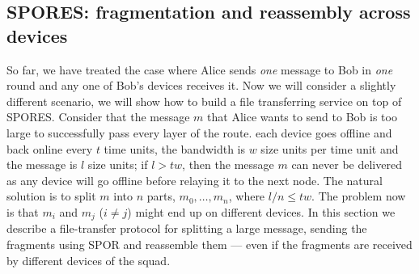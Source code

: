 \subsection{\acs{SPORES}: fragmentation and reassembly across devices}%
\label{SPORES}%
\label{sec:file_transfer}

So far, we have treated the case where Alice sends \emph{one} message to Bob in 
\emph{one} round and any one of Bob's devices receives it.
Now we will consider a slightly different scenario, we will show how to build a 
file transferring service on top of \ac{SPORES}.
Consider that the message \(m\) that Alice wants to send to Bob is too large to 
successfully pass every layer of the route.
\Eg each device goes offline and back online every \(t\) time units, the 
bandwidth is \(w\) size units per time unit and the message is \(l\) size 
units; if \(l > t w\), then the message \(m\) can never be delivered as any 
device will go offline before relaying it to the next node.
The natural solution is to split \(m\) into \(n\) parts, \(m_0, \dotsc, m_n\), 
where \(l/n\leq t w\).
The problem now is that \(m_i\) and \(m_j\) (\(i\neq j\)) might end up on 
different devices.
In this section we describe a file-transfer protocol for splitting a large 
message, sending the fragments using \ac{SPOR} and reassemble them --- even if 
the fragments are received by different devices of the squad.


